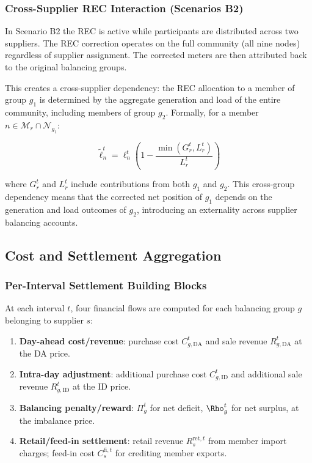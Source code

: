 \documentclass[12pt,a4paper]{article}
\begin{document}
\subsubsection{Cross-Supplier REC Interaction (Scenarios B2)}

In Scenario B2 the REC is active while participants are distributed across two
suppliers.  The REC correction operates on the full community (all nine nodes)
regardless of supplier assignment.  The corrected meters are then attributed
back to the original balancing groups.

This creates a cross-supplier dependency: the REC allocation to a member of
group $g_1$ is determined by the aggregate generation and load of the entire
community, including members of group $g_2$.  Formally, for a member
$n \in \mathcal{M}_{r} \cap \mathcal{N}_{g_1}$:

\begin{equation}
\tilde{\ell}_{n}^{t} = \ell_{n}^{t}\left(1 - \frac{\min(G_{r}^{t}, L_{r}^{t})}{L_{r}^{t}}\right)
\label{eq:cross_bg_rec}
\end{equation}

where $G_{r}^{t}$ and $L_{r}^{t}$ include contributions from both $g_1$ and
$g_2$.  This cross-group dependency means that the corrected net position of
$g_1$ depends on the generation and load outcomes of $g_2$, introducing an
externality across supplier balancing accounts.

\subsection{Cost and Settlement Aggregation}
\label{subsec:cost_aggregation}

\subsubsection{Per-Interval Settlement Building Blocks}

At each interval $t$, four financial flows are computed for each balancing
group $g$ belonging to supplier $s$:

\begin{enumerate}[leftmargin=2.5em, label=(\roman*)]
  \item \textbf{Day-ahead cost/revenue}: purchase cost $C_{g,\mathrm{DA}}^{t}$
        and sale revenue $R_{g,\mathrm{DA}}^{t}$ at the DA price.
  \item \textbf{Intra-day adjustment}: additional purchase cost
        $C_{g,\mathrm{ID}}^{t}$ and additional sale revenue
        $R_{g,\mathrm{ID}}^{t}$ at the ID price.
  \item \textbf{Balancing penalty/reward}: $\Pi_{g}^{t}$ for net deficit,
        $\Rho_{g}^{t}$ for net surplus, at the imbalance price.
  \item \textbf{Retail/feed-in settlement}: retail revenue
        $R_{s}^{\mathrm{ret},t}$ from member import charges; feed-in cost
        $C_{s}^{\mathrm{fi},t}$ for crediting member exports.
\end{enumerate}
\end{document}
